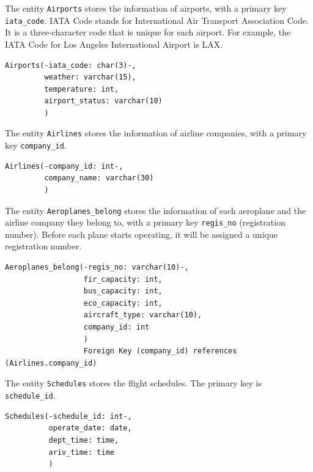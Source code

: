 \documentclass{article}
\begin{document}
	\noindent The entity \texttt{Airports} stores the information of airports, with a primary key \texttt{iata\_code}. IATA Code stands for International Air Transport Association Code. It is a three-character code that is unique for each airport. For example, the IATA Code for Los Angeles International Airport is LAX.
	
	\begin{lstlisting}[keepspaces=true]
Airports(-iata_code: char(3)-, 
         weather: varchar(15),
         temperature: int,
         airport_status: varchar(10)
         )
	\end{lstlisting}

	\noindent The entity \texttt{Airlines} stores the information of airline companies, with a primary key \texttt{company\_id}.
	
	\begin{lstlisting}[keepspaces=true]             
Airlines(-company_id: int-,
         company_name: varchar(30)
         )
	\end{lstlisting}    

	\noindent The entity \texttt{Aeroplanes\_belong} stores the information of each aeroplane and the airline company they belong to, with a primary key \texttt{regis\_no} (registration number). Before each plane starts operating, it will be assigned a unique registration number.
	
	\begin{lstlisting}[keepspaces=true]               
Aeroplanes_belong(-regis_no: varchar(10)-,
                  fir_capacity: int,
                  bus_capacity: int, 
                  eco_capacity: int,
                  aircraft_type: varchar(10), 
                  company_id: int
                  )
                  Foreign Key (company_id) references (Airlines.company_id)
	\end{lstlisting}    
	
	\noindent The entity \texttt{Schedules} stores the flight schedules. The primary key is \texttt{schedule\_id}.
	\begin{lstlisting}[keepspaces=true] 
Schedules(-schedule_id: int-, 
          operate_date: date,
          dept_time: time,
          ariv_time: time
          )
	\end{lstlisting}
\end{document}
